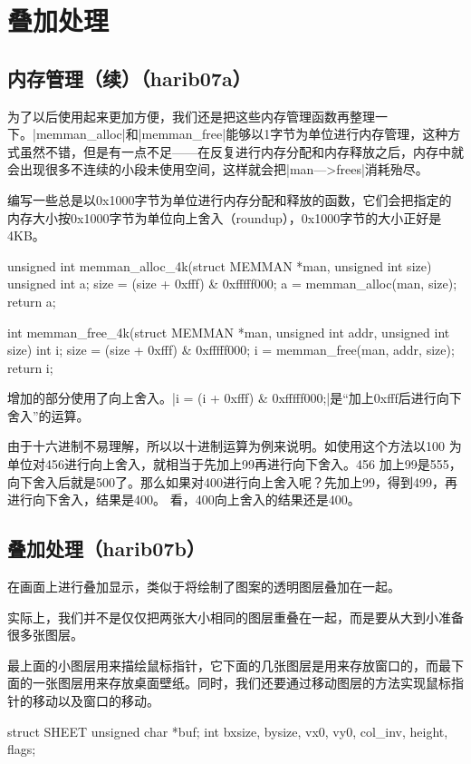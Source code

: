 ﻿\chapter{	叠加处理	}
\section{	内存管理（续）（harib07a）	}

为了以后使用起来更加方便，我们还是把这些内存管理函数再整理一下。|memman_alloc|和|memman_free|能够以1字节为单位进行内存管理，这种方式虽然不错，但是有一点不足——在反复进行内存分配和内存释放之后，内存中就会出现很多不连续的小段未使用空间，这样就会把|man—>frees|消耗殆尽。

编写一些总是以0x1000字节为单位进行内存分配和释放的函数，它们会把指定的内存大小按0x1000字节为单位向上舍入（roundup），0x1000字节的大小正好是4KB。

\begin{code}[label=memory.c节选]
unsigned int memman_alloc_4k(struct MEMMAN *man, unsigned int size)
{
	unsigned int a;
	size = (size + 0xfff) & 0xfffff000;
	a = memman_alloc(man, size);
	return a;
}

int memman_free_4k(struct MEMMAN *man, unsigned int addr, unsigned int size)
{
	int i;
	size = (size + 0xfff) & 0xfffff000;
	i = memman_free(man, addr, size);
	return i;
}
\end{code}

增加的部分使用了向上舍入。|i = (i + 0xfff) & 0xfffff000;|是“加上0xfff后进行向下舍入”的运算。

由于十六进制不易理解，所以以十进制运算为例来说明。如使用这个方法以100 为单位对456进行向上舍入，就相当于先加上99再进行向下舍入。456 加上99是555，向下舍入后就是500了。那么如果对400进行向上舍入呢？先加上99，得到499，再进行向下舍入，结果是400。 看，400向上舍入的结果还是400。
\section{	叠加处理（harib07b）	}
在画面上进行叠加显示，类似于将绘制了图案的透明图层叠加在一起。

实际上，我们并不是仅仅把两张大小相同的图层重叠在一起，而是要从大到小准备很多张图层。

最上面的小图层用来描绘鼠标指针，它下面的几张图层是用来存放窗口的，而最下面的一张图层用来存放桌面壁纸。同时，我们还要通过移动图层的方法实现鼠标指针的移动以及窗口的移动。

\cs

\begin{code}
struct SHEET {
    unsigned char *buf;
    int bxsize, bysize, vx0, vy0, col_inv, height, flags;
}
\end{code}

